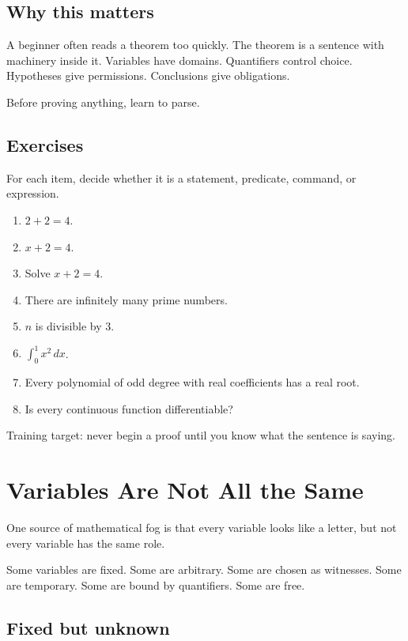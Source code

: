 \documentclass[11pt]{article}
\begin{document}
\subsection{Why this matters}

A beginner often reads a theorem too quickly. The theorem is a sentence with machinery inside it. Variables have domains. Quantifiers control choice. Hypotheses give permissions. Conclusions give obligations.

Before proving anything, learn to parse.

\subsection{Exercises}

For each item, decide whether it is a statement, predicate, command, or expression.

\begin{enumerate}
\item $2+2=4$.
\item $x+2=4$.
\item Solve $x+2=4$.
\item There are infinitely many prime numbers.
\item $n$ is divisible by $3$.
\item $\int_0^1 x^2\,dx$.
\item Every polynomial of odd degree with real coefficients has a real root.
\item Is every continuous function differentiable?
\end{enumerate}

\begin{focusbox}
Training target: never begin a proof until you know what the sentence is saying.
\end{focusbox}

\newpage
\section{Variables Are Not All the Same}

One source of mathematical fog is that every variable looks like a letter, but not every variable has the same role.

Some variables are fixed. Some are arbitrary. Some are chosen as witnesses. Some are temporary. Some are bound by quantifiers. Some are free.

\subsection{Fixed but unknown}
\end{document}
